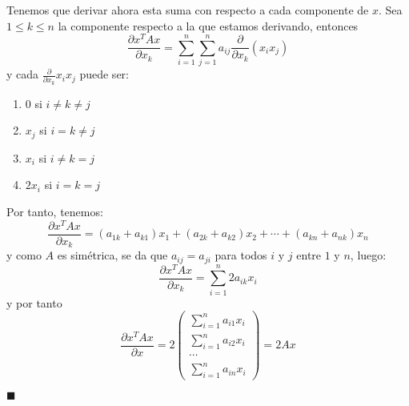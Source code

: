 Tenemos que derivar ahora esta suma con respecto a cada componente de $x$. Sea $1 \leq k \leq n$ la componente respecto a la que estamos derivando, entonces 
\[	\frac{\partial x^TAx}{\partial x_k} = \sum_{i=1}^n \sum_{j=1}^n a_{ij} \frac{\partial}{\partial x_k} (x_ix_j)	\]
y cada $\frac{\partial}{\partial x_k} x_ix_j$ puede ser:
\begin{enumerate}
\item 0 si $i \neq k \neq j$
\item $x_j$ si $i = k \neq j$
\item $x_i$ si $ i \neq k = j$
\item $2x_i$ si $i = k = j$
\end{enumerate}

Por tanto, tenemos:
\[	\frac{\partial x^TAx}{\partial x_k} = (a_{1k} + a_{k1})x_1 + (a_{2k} + a_{k2})x_2 + \cdots + (a_{kn}+a_{nk})x_n	\]
y como $A$ es simétrica, se da que $a_{ij} = a_{ji}$ para todos $i$ y $j$ entre $1$ y $n$, luego:
\[	\frac{\partial x^TAx}{\partial x_k} = \sum_{i=1}^n 2a_{ik}x_i	\]
y por tanto
\[	\frac{\partial x^TAx}{\partial x} = 2
\left( \begin{array}{c}
\sum_{i=1}^n a_{i1}x_i \\
\sum_{i=1}^n a_{i2}x_i \\
\cdots \\
\sum_{i=1}^n a_{in}x_i \end{array} \right) = 2Ax	\]
\begin{flushright}
$\blacksquare$
\end{flushright}



%